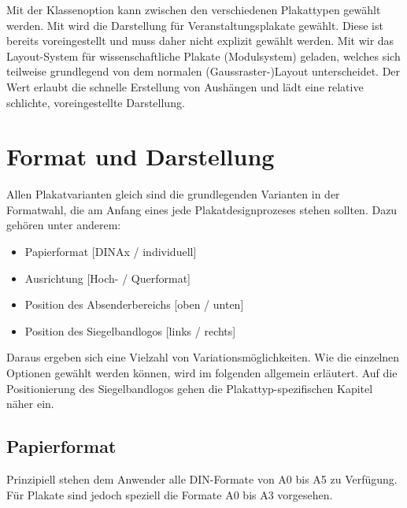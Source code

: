 Mit der Klassenoption  kann zwischen
den verschiedenen Plakattypen gewählt werden.
Mit  wird die Darstellung für Veranstaltungsplakate
gewählt. Diese ist bereits voreingestellt und muss daher nicht explizit gewählt
werden.
Mit  wir das Layout-System für wissenschaftliche Plakate
(Modulsystem) geladen, welches sich teilweise grundlegend von
dem normalen (Gaussraster-)Layout unterscheidet.
Der Wert  erlaubt die schnelle Erstellung von
Aushängen und lädt eine relative schlichte, voreingestellte Darstellung.


\section{Format und Darstellung}

Allen Plakatvarianten gleich sind die grundlegenden Varianten in der Formatwahl,
die am Anfang eines jede Plakatdesignprozeses stehen sollten.
Dazu gehören unter anderem:

\begin{itemize}
  \item Papierformat [DIN\;Ax / individuell]
  \item Ausrichtung [Hoch- / Querformat]
  \item Position des Absenderbereichs [oben / unten]
  \item Position des Siegelbandlogos [links / rechts]
\end{itemize}

Daraus ergeben sich eine Vielzahl von Variationsmöglichkeiten.
Wie die einzelnen Optionen gewählt werden können, wird im folgenden
allgemein erläutert.
Auf die Positionierung des Siegelbandlogos gehen die Plakattyp-spezifischen
Kapitel näher ein.%

\subsection*{Papierformat}%

Prinzipiell stehen dem Anwender alle DIN-Formate von A0 bis A5 zu Verfügung.
Für Plakate sind jedoch speziell die Formate A0 bis A3 vorgesehen.


\begin{Declaration}
  \\
  \\
  \\
  \\
\end{Declaration}

